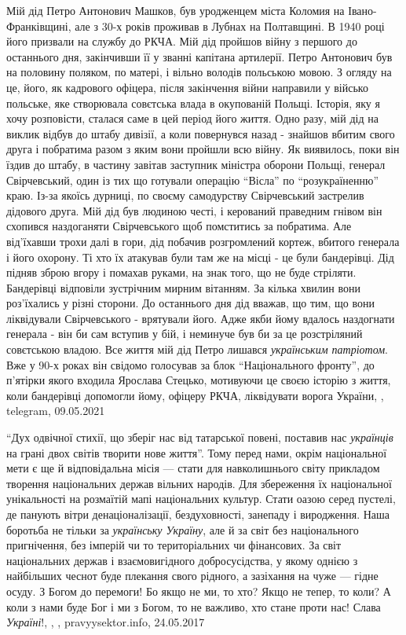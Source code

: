 Мій дід Петро Антонович Машков, був уродженцем міста Коломия на
Івано-Франківщині, але з 30-х років проживав в Лубнах на Полтавщині. В 1940
році його призвали на службу до РКЧА. Мій дід пройшов війну з першого до
останнього дня, закінчивши її у званні капітана артилерії. Петро Антонович був
на половину поляком, по матері, і вільно володів польською мовою. З огляду на
це, його, як кадрового офіцера, після закінчення війни направили у військо
польське, яке створювала совєтська влада в окупованій Польщі. Історія, яку я
хочу розповісти, сталася саме в цей період його життя. Одно разу, мій дід на
виклик відбув до штабу дивізії, а коли повернувся назад - знайшов вбитим свого
друга і побратима разом з яким вони пройшли всю війну. Як виявилось, поки він
їздив до штабу, в частину завітав заступник міністра оборони Польщі, генерал
Свірчевський, один із тих що готували операцію \enquote{Вісла} по \enquote{розукраїненню} краю.
Із-за якоїсь дурниці, по своєму самодурству Свірчевський застрелив дідового
друга. Мій дід був людиною честі, і керований праведним гнівом він схопився
наздоганяти Свірчевського щоб помститись за побратима. Але від'їхавши трохи
далі в гори, дід побачив розгромлений кортеж, вбитого генерала і його охорону.
Ті хто їх атакував були там же на місці - це були бандерівці. Дід підняв зброю
вгору і помахав руками, на знак того, що не буде стріляти. Бандерівці відповіли
зустрічним мирним вітанням. За кілька хвилин вони роз'їхались у різні сторони.
До останнього дня дід вважав, що тим, що вони ліквідували Свірчевського  -
врятували його. Адже якби йому вдалось наздогнати генерала - він би сам вступив
у бій, і неминуче був би за це розстріляний совєтською владою.  Все життя мій
дід Петро лишався \emph{українським патріотом}. Вже у 90-х роках він свідомо голосував
за блок \enquote{Національного фронту}, до п'ятірки якого входила Ярослава Стецько,
мотивуючи це своєю історію з життя, коли бандерівці допомогли йому, офіцеру
РКЧА, ліквідувати ворога України, , telegram, 09.05.2021

\enquote{Дух одвічної стихії, що зберіг нас від татарської повені, поставив нас
\emph{українців} на грані двох світів творити нове життя}. Тому перед нами, окрім
національної мети є ще й відповідальна місія — стати для навколишнього світу
прикладом творення національних держав вільних народів. Для збереження їх
національної унікальності на розмаїтій мапі національних культур. Стати оазою
серед пустелі, де панують вітри денаціоналізації, бездуховності, занепаду і
виродження. Наша боротьба не тільки за \emph{українську Україну}, але й за світ без
національного пригнічення, без імперій чи то територіальних чи фінансових. За
світ національних держав і взаємовигідного добросусідства, у якому однією з
найбільших чеснот буде плекання свого рідного, а зазіхання на чуже — гідне
осуду. З Богом до перемоги! Бо якщо не ми, то хто? Якщо не тепер, то коли?  А
коли з нами буде Бог і ми з Богом, то не важливо, хто стане проти нас!  Слава
\emph{Україні}!,
, , pravyysektor.info, 24.05.2017

